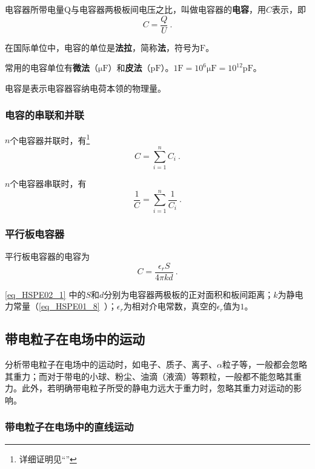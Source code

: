 电容器所带电量Q与电容器两极板间电压之比，叫做电容器的\textbf{电容}，用$C$表示，即
\begin{equation}
C=\frac{Q}{U}~.
\end{equation}

在国际单位中，电容的单位是\textbf{法拉}，简称\textbf{法}，符号为$\mathrm{F}$。

常用的电容单位有\textbf{微法}（$\mathrm{\mu F}$）和\textbf{皮法}（$\mathrm{pF}$）。$1\mathrm{F}=10^6 \mathrm{\mu F}=10^{12} \mathrm{pF}$。

电容是表示电容器容纳电荷本领的物理量。

\subsubsection{电容的串联和并联}
$n$个电容器并联时，有\footnote{详细证明见“”}
\begin{equation}
C=\sum_{i=1}^{n}C_i~.
\end{equation}

$n$个电容器串联时，有
\begin{equation}
\frac{1}{C}=\sum_{i=1}^{n}\frac{1}{C_i}~.
\end{equation}

\subsubsection{平行板电容器}

平行板电容器的电容为
\begin{equation}\label{eq_HSPE02_1}
C = \frac {\epsilon_r S}{4\pi kd}~.
\end{equation}

\autoref{eq_HSPE02_1} 中的$S$和$d$分别为电容器两极板的正对面积和板间距离；$k$为静电力常量（\autoref{eq_HSPE01_8}~）；$\epsilon_r$为相对介电常数，真空的$\epsilon_r$值为$1$。

\subsection{带电粒子在电场中的运动}

分析带电粒子在电场中的运动时，如电子、质子、离子、$\alpha$粒子等，一般都会忽略其重力；而对于带电的小球、粉尘、油滴（液滴）等颗粒，一般都不能忽略其重力。此外，若明确带电粒子所受的静电力远大于重力时，忽略其重力对运动的影响。

\subsubsection{带电粒子在电场中的直线运动}


